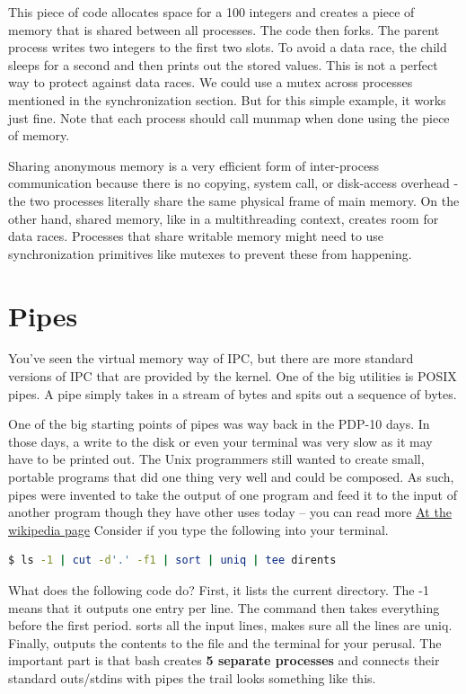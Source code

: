 This piece of code allocates space for a 100 integers and creates a piece of memory that is shared between all processes.
The code then forks.
The parent process writes two integers to the first two slots.
To avoid a data race, the child sleeps for a second and then prints out the stored values.
This is not a perfect way to protect against data races.
We could use a mutex across processes mentioned in the synchronization section.
But for this simple example, it works just fine.
Note that each process should call munmap when done using the piece of memory.

Sharing anonymous memory is a very efficient form of inter-process communication because there is no copying, system call, or disk-access overhead - the two processes literally share the same physical frame of main memory.
On the other hand, shared memory, like in a multithreading context, creates room for data races.
Processes that share writable memory might need to use synchronization primitives like mutexes to prevent these from happening.

\section{Pipes}

You've seen the virtual memory way of IPC, but there are more standard versions of IPC that are provided by the kernel.
One of the big utilities is POSIX pipes.
A pipe simply takes in a stream of bytes and spits out a sequence of bytes.

One of the big starting points of pipes was way back in the PDP-10 days. In those days, a write to the disk or even your terminal was very slow as it may have to be printed out.
The Unix programmers still wanted to create small, portable programs that did one thing very well and could be composed.
As such, pipes were invented to take the output of one program
and feed it to the input of another program though they have other uses today -- you can read more \href{https://en.wikipedia.org/wiki/Pipeline\_\%28Unix\%29}{At the wikipedia page}
Consider if you type the following into your terminal.

\begin{lstlisting}[language=bash]
$ ls -1 | cut -d'.' -f1 | sort | uniq | tee dirents
\end{lstlisting}

What does the following code do?
First, it lists the current directory.
The -1 means that it outputs one entry per line.
The  command then takes everything before the first period.
 sorts all the input lines,  makes sure all the lines are uniq.
Finally,  outputs the contents to the file  and the terminal for your perusal.
The important part is that bash creates \textbf{5 separate processes} and connects their standard outs/stdins with pipes the trail looks something like this.

